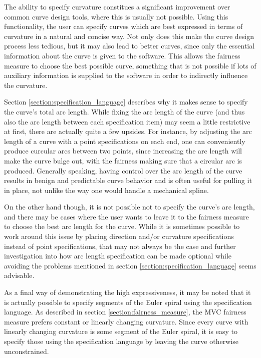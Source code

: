 \documentclass[a4paper]{article}
\begin{document}
				The ability to specify curvature constitues a significant improvement over common curve design tools, where this is usually not possible. Using this functionality, the user can specify curves which are best expressed in terms of curvature in a natural and concise way. Not only does this make the curve design process less tedious, but it may also lead to better curves, since only the essential information about the curve is given to the software. This allows the fairness measure to choose the best possible curve, something that is not possible if lots of auxiliary information is supplied to the software in order to indirectly influence the curvature.

				Section \ref{section:specification_language} describes why it makes sense to specify the curve's total arc length. While fixing the arc length of the curve (and thus also the arc length between each specification item) may seem a little restrictive at first, there are actually quite a few upsides. For instance, by adjusting the arc length of a curve with a point specifications on each end, one can conveniently produce curcular arcs between two points, since increasing the arc length will make the curve bulge out, with the fairness making sure that a circular arc is produced.
				Generally speaking, having control over the arc length of the curve results in benign and predictable curve behavior and is often useful for pulling it in place, not unlike the way one would handle a mechanical spline.

				On the other hand though, it is not possible not to specify the curve's arc length, and there may be cases where the user wants to leave it to the fairness measure to choose the best arc length for the curve. While it is sometimes possible to work around this issue by placing direction and/or curvature specifications instead of point specifications, that may not always be the case and further investigation into how arc length specification can be made optional while avoiding the problems mentioned in section \ref{section:specification_language} seems advisable.

				As a final way of demonstrating the high expressiveness, it may be noted that it is actually possible to specify segments of the Euler spiral using the specification language. As described in section \ref{section:fairness_measure}, the MVC fairness measure prefers constant or linearly changing curvature. Since every curve with linearly changing curvature is some segment of the Euler spiral, it is easy to specify those using the specification language by leaving the curve otherwise unconstrained.
\end{document}
